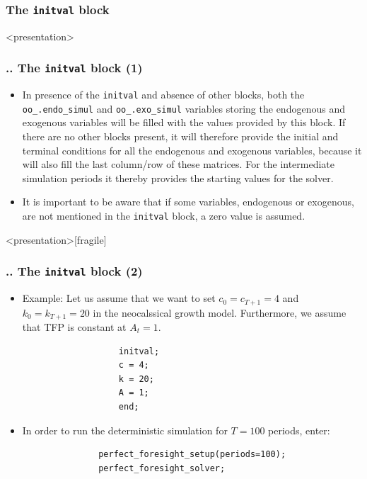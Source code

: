 \documentclass[11pt,aspectratio=169]{beamer}
\begin{document}
\subsubsection{The \texttt{initval} block}
\begin{frame}<presentation>
	\frametitle{{\thesection.\thesubsection.\thesubsubsection} The \texttt{initval} block (1)}
	\begin{itemize}
		\justifying
		\item In presence of the \texttt{initval} and absence of other blocks, both the \texttt{oo\_.endo\_simul} and \texttt{oo\_.exo\_simul} variables storing the endogenous and exogenous variables will be filled with the values provided by this block. If there are no other blocks present, it will therefore provide the initial and terminal conditions for all the endogenous and exogenous variables, because it will also fill the last column/row of these matrices.  For the intermediate simulation periods it thereby provides the starting values for the solver. 
		\item It is important to be aware that if some variables, endogenous or exogenous, are not mentioned in the \texttt{initval} block, a zero value is assumed.
	\end{itemize}
\end{frame}
\begin{frame}<presentation>[fragile]
	\frametitle{{\thesection.\thesubsection.\thesubsubsection} The \texttt{initval} block (2)}
	\begin{itemize}
		\justifying
		\item Example: Let us assume that we want to set $c_0=c_{T+1}=4$ and $k_0=k_{T+1}=20$ in the neocalssical growth model. Furthermore, we assume that TFP is constant at $A_t=1$. 
			\begin{verbatim}
				   initval;
				   c = 4;
				   k = 20;
				   A = 1;
				   end;
			\end{verbatim}
		\item In order to run the deterministic simulation for $T=100$ periods, enter:
			\begin{verbatim}
			   perfect_foresight_setup(periods=100);
			   perfect_foresight_solver;
			\end{verbatim}
	\end{itemize}
\end{frame}
\end{document}

